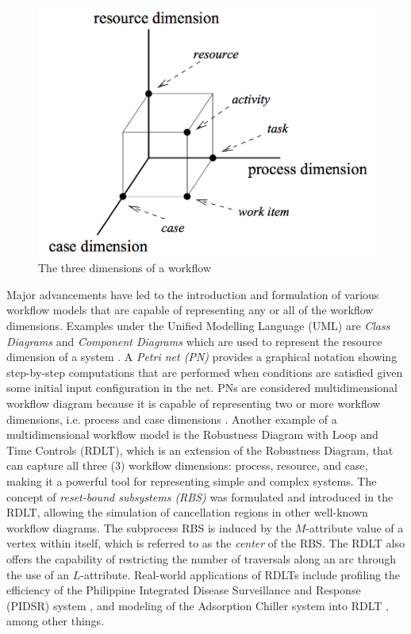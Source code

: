 \documentclass[12pt]{article}
\begin{document}
    \begin{figure}[h]
        \centering
        \includegraphics{figures/workflow-dimensions.png}
        \caption{The three dimensions of a workflow \cite{vanderaalst}}
        \label{workflow_dimensions}
    \end{figure} \par

    Major advancements have led to the introduction and formulation of various workflow models that are capable of representing any or all of the workflow dimensions. Examples under the Unified Modelling Language (UML) are \textit{Class Diagrams} and \textit{Component Diagrams} which are used to represent the resource dimension of a system \cite{uml}. A \textit{Petri net (PN)} provides a graphical notation showing step-by-step computations that are performed when conditions are satisfied given some initial input configuration in the net. PNs are considered multidimensional workflow diagram because it is capable of representing two or more workflow dimensions, i.e. process and case dimensions \cite{yiu}. Another example of a multidimensional workflow model is the Robustness Diagram with Loop and Time Controls (RDLT), which is an extension of the Robustness Diagram, that can capture all three (3) workflow dimensions: process, resource, and case, making it a powerful tool for representing simple and complex systems. The concept of \textit{reset-bound subsystems (RBS)} was formulated and introduced in the RDLT, allowing the simulation of cancellation regions in other well-known workflow diagrams. The subprocess RBS is induced by the $M$-attribute value of a vertex within itself, which is referred to as the \textit{center} of the RBS. The RDLT also offers the capability of restricting the number of traversals along an arc through the use of an $L$-attribute. Real-world applications of RDLTs include profiling the efficiency of the Philippine Integrated Disease Surveillance and Response (PIDSR) system \cite{lopez-etal}, and modeling of the Adsorption Chiller system into RDLT \cite{malinao-rdlt}, among other things. \par
\end{document}

